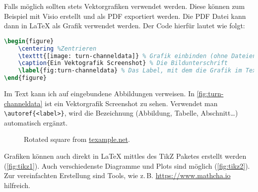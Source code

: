 Falls möglich sollten stets Vektorgrafiken verwendet werden. Diese können zum Beispiel mit Visio erstellt und als PDF exportiert werden. Die PDF Datei kann dann in \LaTeX{} als Grafik verwendet werden. Der Code hierfür lautet wie folgt:

\begin{lstlisting}[language=latex,float]
\begin{figure}
	\centering %Zentrieren
	\texttt{[image: turn-channeldata]} % Grafik einbinden (ohne Dateiendung) und auf 85 % der Seitenbreite Skalieren
	\caption{Ein Vektografik Screenshot} % Die Bildunterschrift
	\label{fig:turn-channeldata} % Das Label, mit dem die Grafik im Text referenziert werden kann
\end{figure}
\end{lstlisting}

Im Text kann ich auf eingebundene Abbildungen verweisen. In \autoref{fig:turn-channeldata} ist ein Vektorgrafik Screenshot zu sehen. Verwendet man \verb|\autoref{<label>}|, wird die Bezeichnung (Abbildung, Tabelle, Abschnitt\dots) automatisch ergänzt.


\begin{figure}[ht]
	\setcounter{density}{20}
	\centering
	\caption{Rotated square from
		\href{http://www.texample.net/tikz/examples/rotated-polygons/}{texample.net}.}
	\label{fig:tikz1}
\end{figure}

Grafiken können auch direkt in \LaTeX{} mittles des TikZ Paketes erstellt werden (\autoref{fig:tikz1}). Auch verschiedenste Diagramme und Plots sind möglich (\autoref{fig:tikz2}). Zur vereinfachten Erstellung sind Tools, wie z.\,B. \href{https://www.mathcha.io}{https://www.mathcha.io} hilfreich.

